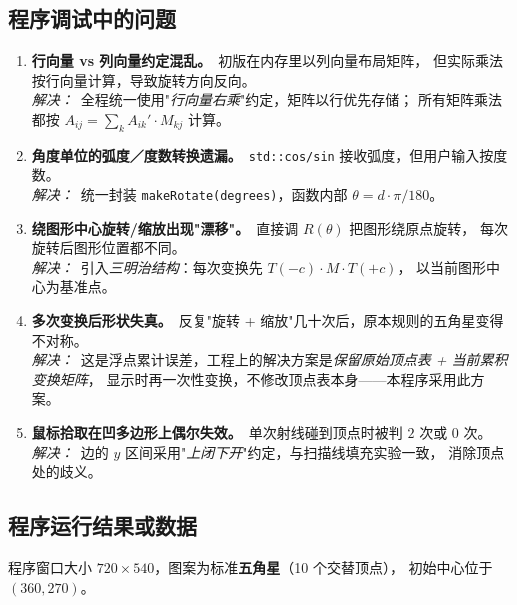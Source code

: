 \documentclass[a4paper,12pt]{ctexart}
\begin{document}
\subsection{程序调试中的问题}

\begin{enumerate}[leftmargin=2em,itemsep=0.4em]
    \item \textbf{行向量 vs 列向量约定混乱。}\ 初版在内存里以列向量布局矩阵，
        但实际乘法按行向量计算，导致旋转方向反向。\\
        \textit{解决：}\ 全程统一使用"\emph{行向量右乘}"约定，矩阵以行优先存储；
        所有矩阵乘法都按 $A_{ij}=\sum_k A_{ik}'\cdot M_{kj}$ 计算。

    \item \textbf{角度单位的弧度／度数转换遗漏。}\ \texttt{std::cos/sin} 接收弧度，但用户输入按度数。\\
        \textit{解决：}\ 统一封装 \texttt{makeRotate(degrees)}，函数内部 $\theta = d \cdot \pi/180$。

    \item \textbf{绕图形中心旋转/缩放出现"漂移"。}\ 直接调 $R(\theta)$ 把图形绕原点旋转，
        每次旋转后图形位置都不同。\\
        \textit{解决：}\ 引入\emph{三明治结构}：每次变换先 $T(-c)\cdot M\cdot T(+c)$，
        以当前图形中心为基准点。

    \item \textbf{多次变换后形状失真。}\ 反复"旋转 + 缩放"几十次后，原本规则的五角星变得不对称。\\
        \textit{解决：}\ 这是浮点累计误差，工程上的解决方案是\emph{保留原始顶点表 + 当前累积变换矩阵}，
        显示时再一次性变换，不修改顶点表本身——本程序采用此方案。

    \item \textbf{鼠标拾取在凹多边形上偶尔失效。}\ 单次射线碰到顶点时被判 $2$ 次或 $0$ 次。\\
        \textit{解决：}\ 边的 $y$ 区间采用"\emph{上闭下开}"约定，与扫描线填充实验一致，
        消除顶点处的歧义。
\end{enumerate}

\subsection{程序运行结果或数据}

程序窗口大小 $720\times 540$，图案为标准\textbf{五角星}（10 个交替顶点），
初始中心位于 $(360,270)$。
\end{document}
